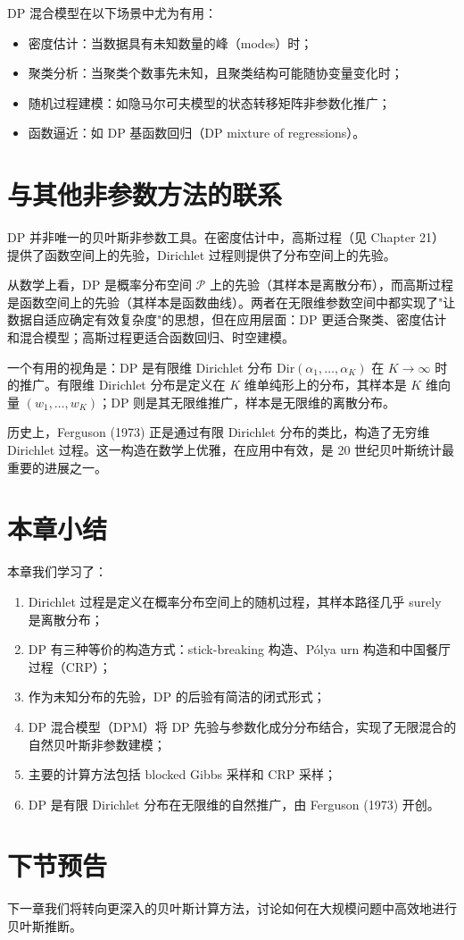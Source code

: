 DP 混合模型在以下场景中尤为有用：
\begin{itemize}
  \item 密度估计：当数据具有未知数量的峰（modes）时；
  \item 聚类分析：当聚类个数事先未知，且聚类结构可能随协变量变化时；
  \item 随机过程建模：如隐马尔可夫模型的状态转移矩阵非参数化推广；
  \item 函数逼近：如 DP 基函数回归（DP mixture of regressions）。
\end{itemize}

\section{与其他非参数方法的联系}

DP 并非唯一的贝叶斯非参数工具。在密度估计中，高斯过程（见 Chapter 21）提供了函数空间上的先验，Dirichlet 过程则提供了分布空间上的先验。

从数学上看，DP 是概率分布空间 $\mathcal{P}$ 上的先验（其样本是离散分布），而高斯过程是函数空间上的先验（其样本是函数曲线）。两者在无限维参数空间中都实现了"让数据自适应确定有效复杂度"的思想，但在应用层面：DP 更适合聚类、密度估计和混合模型；高斯过程更适合函数回归、时空建模。

一个有用的视角是：DP 是有限维 Dirichlet 分布 $\mathrm{Dir}(\alpha_1, \ldots, \alpha_K)$ 在 $K \to \infty$ 时的推广。有限维 Dirichlet 分布是定义在 $K$ 维单纯形上的分布，其样本是 $K$ 维向量 $(w_1, \ldots, w_K)$；DP 则是其无限维推广，样本是无限维的离散分布。

历史上，Ferguson (1973) 正是通过有限 Dirichlet 分布的类比，构造了无穷维 Dirichlet 过程。这一构造在数学上优雅，在应用中有效，是 20 世纪贝叶斯统计最重要的进展之一。

\section{本章小结}

本章我们学习了：
\begin{enumerate}
  \item Dirichlet 过程是定义在概率分布空间上的随机过程，其样本路径几乎 surely 是离散分布；
  \item DP 有三种等价的构造方式：stick-breaking 构造、Pólya urn 构造和中国餐厅过程（CRP）；
  \item 作为未知分布的先验，DP 的后验有简洁的闭式形式；
  \item DP 混合模型（DPM）将 DP 先验与参数化成分分布结合，实现了无限混合的自然贝叶斯非参数建模；
  \item 主要的计算方法包括 blocked Gibbs 采样和 CRP 采样；
  \item DP 是有限 Dirichlet 分布在无限维的自然推广，由 Ferguson (1973) 开创。
\end{enumerate}

\section{下节预告}

下一章我们将转向更深入的贝叶斯计算方法，讨论如何在大规模问题中高效地进行贝叶斯推断。

\endinput

